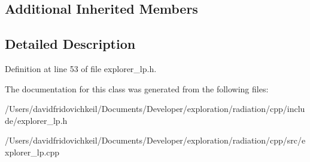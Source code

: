 \subsection*{Additional Inherited Members}


\subsection{Detailed Description}


Definition at line 53 of file explorer\+\_\+lp.\+h.



The documentation for this class was generated from the following files\+:\begin{DoxyCompactItemize}
\item 
/\+Users/davidfridovichkeil/\+Documents/\+Developer/exploration/radiation/cpp/include/explorer\+\_\+lp.\+h\item 
/\+Users/davidfridovichkeil/\+Documents/\+Developer/exploration/radiation/cpp/src/explorer\+\_\+lp.\+cpp\end{DoxyCompactItemize}
